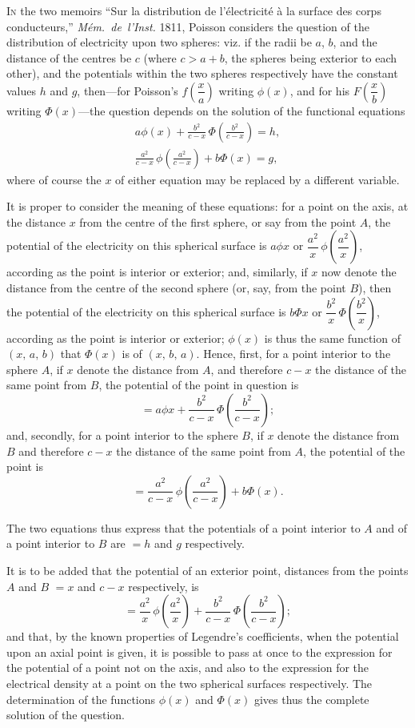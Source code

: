 \documentclass[11pt,a4paper]{book}
\begin{document}
\textsc{In} the two memoirs ``Sur la distribution de l'\'electricit\'e \`a la surface des corps conducteurs,'' \textit{M\'em.~de~l'Inst.} 1811, Poisson considers the question of the distribution of electricity upon two spheres: viz. if the radii be $a$, $b$, and the distance of the centres be $c$ (where $c > a+b$, the spheres being exterior to each other), and the potentials within the two spheres respectively have the constant values $h$ and $g$, then---for Poisson's $f\!\left(\dfrac{x}{a}\right)$ writing $\phi(x)$, and for his $F\!\left(\dfrac{x}{b}\right)$ writing $\Phi(x)$---the question depends on the solution of the functional equations
\begin{gather*}
a\phi(x) + \frac{b^2}{c-x}\,\Phi\!\left(\frac{b^2}{c-x}\right) = h,\\
\frac{a^2}{c-x}\,\phi\!\left(\frac{a^2}{c-x}\right) + b\Phi(x) = g,
\end{gather*}
where of course the $x$ of either equation may be replaced by a different variable.

It is proper to consider the meaning of these equations: for a point on the axis, at the distance $x$ from the centre of the first sphere, or say from the point $A$, the potential of the electricity on this spherical surface is $a\phi x$ or $\dfrac{a^2}{x}\,\phi\!\left(\dfrac{a^2}{x}\right)$, according as the point is interior or exterior; and, similarly, if $x$ now denote the distance from the centre of the second sphere (or, say, from the point $B$), then the potential of the electricity on this spherical surface is $b\Phi x$ or $\dfrac{b^2}{x}\,\Phi\!\left(\dfrac{b^2}{x}\right)$, according as the point is interior or exterior; $\phi(x)$ is thus the same function of $(x,\, a,\, b)$ that $\Phi(x)$ is of $(x,\, b,\, a)$. Hence, first, for a point interior to the sphere $A$, if $x$ denote the distance from $A$, and therefore $c-x$ the distance of the same point from $B$, the potential of the point in question is
\[
= a\phi x + \frac{b^2}{c-x}\,\Phi\!\left(\frac{b^2}{c-x}\right);
\]
and, secondly, for a point interior to the sphere $B$, if $x$ denote the distance from $B$ and therefore $c-x$ the distance of the same point from $A$, the potential of the point is
\[
= \frac{a^2}{c-x}\,\phi\!\left(\frac{a^2}{c-x}\right) + b\Phi(x).
\]

The two equations thus express that the potentials of a point interior to $A$ and of a point interior to $B$ are $=h$ and $g$ respectively.

It is to be added that the potential of an exterior point, distances from the points $A$ and $B$ $=x$ and $c-x$ respectively, is
\[
= \frac{a^2}{x}\,\phi\!\left(\frac{a^2}{x}\right) + \frac{b^2}{c-x}\,\Phi\!\left(\frac{b^2}{c-x}\right);
\]
and that, by the known properties of Legendre's coefficients, when the potential upon an axial point is given, it is possible to pass at once to the expression for the potential of a point not on the axis, and also to the expression for the electrical density at a point on the two spherical surfaces respectively. The determination of the functions $\phi(x)$ and $\Phi(x)$ gives thus the complete solution of the question.
\end{document}
